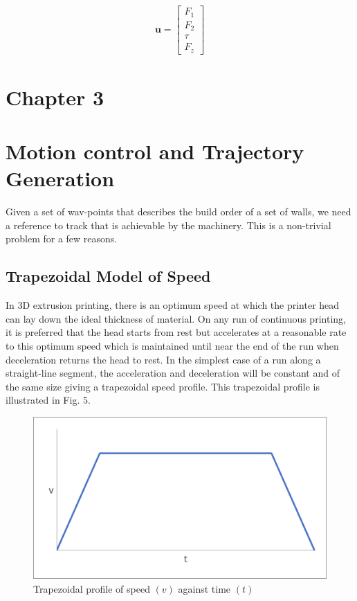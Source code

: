 \documentclass{UoNMCHA}
\numberwithin{equation}{section}
\begin{document}
\begin{align}
\boldsymbol{u}=\left[\begin{array}{c}
	F_{1} \\
	F_{2} \\
	\tau \\
	F_{z}
\end{array}\right]
\end{align}
	
	\newpage
	\section*{Chapter 3}
	\section{Motion control and Trajectory Generation}
	
	Given a set of wav-points that describes the build order of a set of walls, we need a reference to track
	that is achievable by the machinery. This is a non-trivial problem for a few reasons.
	\subsection{Trapezoidal Model of Speed}
	In $3 \mathrm{D}$ extrusion printing, there is an optimum speed at which the printer head can lay down the ideal
	thickness of material. On any run of continuous printing, it is preferred that the head starts from rest but
	accelerates at a reasonable rate to this optimum speed which is maintained until near the end of the run
	when deceleration returns the head to rest. In the simplest case of a run along a straight-line segment,
	the acceleration and deceleration will be constant and of the same size giving a trapezoidal speed profile.
	This trapezoidal profile is illustrated in Fig. $5 .$
	
	\begin{figure}[H]
		\begin{center}
			\includegraphics[width=.8\linewidth]{figs/Picture9}
			\caption{Trapezoidal profile of speed $ (v) $ against time $ (t) $}
			\label{figs/Picture9}
		\end{center}
	\end{figure}
	
\end{document}
